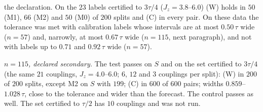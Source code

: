 \documentclass[aps,prx,onecolumn,10pt,nofootinbib,longbibliography,floatfix]{revtex4-2}
\theoremstyle{remark}
\newcommand{\Jz}{J_z}
\begin{document}
the declaration. On the $23$ labels certified to $3\tau/4$ ($\Jz=3.8$--$6.0$) (W) holds in $50$ (M1), $66$ (M2) %
and $50$ (M0) of $200$ splits and (C) in every pair. On these data the tolerance was met with calibration labels %
whose intervals are at most $0.50\,\tau$ wide ($n=57$) and, narrowly, at most $0.67\,\tau$ wide ($n=115$, next %
paragraph), and not with labels up to $0.71$ and $0.92\,\tau$ wide ($n=57$). %

\emph{$n=115$, declared secondary.} The test passes on $S$ and on the set certified to $3\tau/4$ (the same $21$ %
couplings, $\Jz=4.0$--$6.0$; $6$, $12$ and $3$ couplings per split): (W) in $200$ of $200$ splits, except M2 on %
$S$ with $199$; (C) in $600$ of $600$ pairs; widths $0.859$--$1.028\,\tau$, close to the tolerance and wider than %
the forecast. The control passes as well. The set certified to $\tau/2$ has $10$ couplings and was not run. %

\def\SMcap{The same splits with other scores (declared sets). (W): percentage of the splits with the interval at
most $\tau(x)$ wide at every query; (C): percentage of the (split, query) pairs with the truth inside; widths in
units of $\tau(x)$, ranges rounded outward. ``Interval score'': the declared test. ``Standard score'' (post hoc):
the calibration score is the distance to the public label, as in standard split conformal prediction.
``Normalized'' (declared secondary, no rule): the score divided by a log-linear interpolation of the calibration
labels' interval widths, with the public label (literal) or with the worst case over its exact interval.
``Constant'' (post hoc): the mean of the training labels as the model. Last column: range of the band $W(x)$ of
Proposition~2(a) with the exact intervals (n.a.\ for the control, which uses labels without %
one).}\def\SMlab{tab:rdlearn_f3post}

\end{document}
